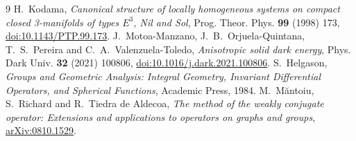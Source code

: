\documentclass[10pt]{article}
\begin{document}
\begin{thebibliography}{9}
H.~Kodama, \emph{Canonical structure of locally homogeneous systems on compact closed 3-manifolds of types $E^3$, Nil and Sol}, Prog. Theor. Phys. \textbf{99} (1998) 173, \href{https://doi.org/10.1143/PTP.99.173}{doi:10.1143/PTP.99.173}.
J.~Motoa-Manzano, J.~B.~Orjuela-Quintana, T.~S.~Pereira and C.~A.~Valenzuela-Toledo, \emph{Anisotropic solid dark energy}, Phys. Dark Univ. \textbf{32} (2021) 100806, \href{https://doi.org/10.1016/j.dark.2021.100806}{doi:10.1016/j.dark.2021.100806}.
S.~Helgason, \emph{Groups and Geometric Analysis: Integral Geometry, Invariant Differential Operators, and Spherical Functions}, Academic Press, 1984.
M.~M\u{a}ntoiu, S.~Richard and R.~Tiedra de Aldecoa, \emph{The method of the weakly conjugate operator: Extensions and applications to operators on graphs and groups}, \href{https://arxiv.org/abs/0810.1529}{arXiv:0810.1529}.
\end{thebibliography}
\end{document}
